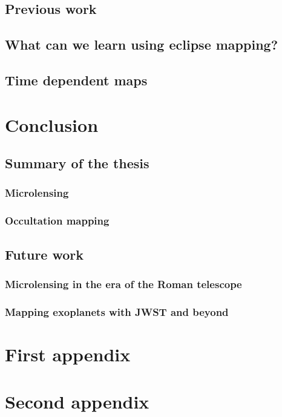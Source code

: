\documentclass[]{report}
\begin{document}
\section{Previous work}
\section{What can we learn using eclipse mapping?}
\section{Time dependent maps}

\chapter{Conclusion}
\section{Summary of the thesis}
\subsection{Microlensing}
\subsection{Occultation mapping}
\section{Future work}
\subsection{Microlensing in the era of the Roman telescope}
\subsection{Mapping exoplanets with JWST and beyond}

\appendix

\chapter{First appendix}
\chapter{Second appendix}
\end{document}
